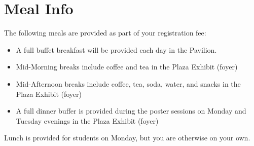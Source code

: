 \setheaders{}{}
\section{Meal Info}{}

The following meals are provided as part of your registration fee:

\begin{itemize}
\item A full buffet breakfast will be provided each day in the Pavilion.
\item Mid-Morning breaks include coffee and tea in the Plaza Exhibit
  (foyer)
\item Mid-Afternoon breaks include coffee, tea, soda, water, and
  snacks in the Plaza Exhibit (foyer)
\item A full dinner buffer is provided during the poster sessions on
  Monday and Tuesday evenings in the Plaza Exhibit (foyer)
\end{itemize}

Lunch is provided for students on Monday, but you are otherwise on
your own.


